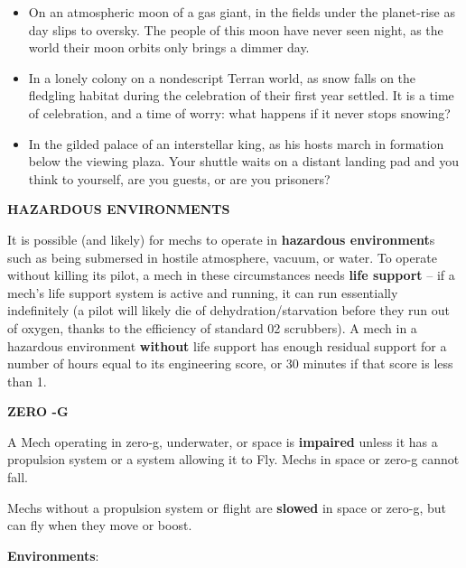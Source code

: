 \begin{itemize}
    \item On an atmospheric moon of a gas giant, in the fields under the planet-rise as day slips to oversky. The people of this moon have never seen night, as the world their moon orbits only brings a dimmer day.
    \item In a lonely colony on a nondescript Terran world, as snow falls on the fledgling habitat during the celebration of their first year settled. It is a time of celebration, and a time of worry: what happens if it never stops snowing?
    \item In the gilded palace of an interstellar king, as his hosts march in formation below the viewing plaza. Your shuttle waits on a distant landing pad and you think to yourself, are you guests, or are you prisoners?
\end{itemize}

\textbf{HAZARDOUS ENVIRONMENTS}

It is possible (and likely) for mechs to operate in \textbf{hazardous environment}s such as being
submersed in hostile atmosphere, vacuum, or water. To operate without killing its pilot, a mech in
these circumstances needs \textbf{life support} -- if a mech’s life support system is active and running,
it can run essentially indefinitely (a pilot will likely die of dehydration/starvation before they run
out of oxygen, thanks to the efficiency of standard 02 scrubbers). A mech in a hazardous
environment \textbf{without} life support has enough residual support for a number of hours equal to its
engineering score, or 30 minutes if that score is less than 1.

\begin{center}
    \textbf{ZERO -G}
\end{center}

A Mech operating in zero-g, underwater, or space is \textbf{impaired} unless it has a propulsion system
or a system allowing it to Fly. Mechs in space or zero-g cannot fall.

Mechs without a propulsion system or flight are \textbf{slowed} in space or zero-g, but can fly when
they move or boost.

\begin{center}
    \textbf{Environments}:
\end{center}

